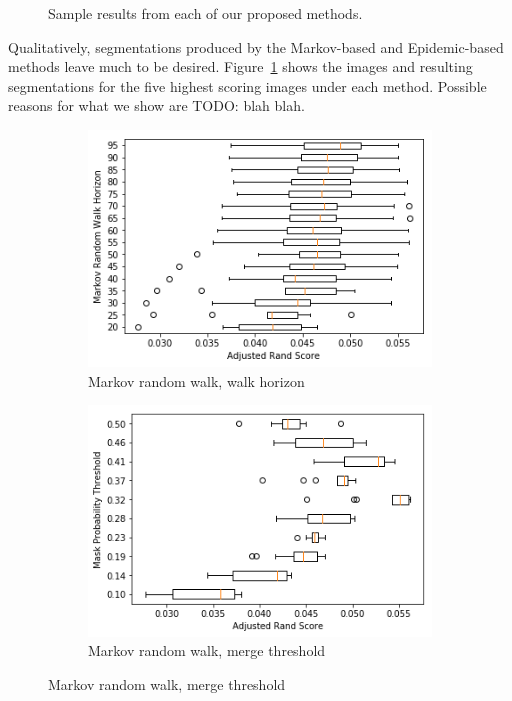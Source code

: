 \documentclass[twocolumn]{article}
\newcommand{\todo}[1]{}
\renewcommand{\todo}[1]{{\color{red} TODO: {#1}}}
\newcommand{\figref}[1]{Figure~\ref{fig:#1}}
\newcommand{\figlab}[1]{\label{fig:#1}}
\begin{document}
\begin{figure}[t!]
\caption{Sample results from each of our proposed methods.}
\figlab{sample_results}
\end{figure}

Qualitatively, segmentations produced by the Markov-based and Epidemic-based
methods leave much to be desired. \figref{sample_results} shows the images and
resulting segmentations for the five highest scoring images under each method.
Possible reasons for what we show are \todo{blah blah}.

\begin{figure}[t!]
  \centering

  \begin{subfigure}{0.49\linewidth}
    \includegraphics[width=\linewidth]{figs/markov_horizon.png}
    \caption{Markov random walk, walk horizon}
  \end{subfigure}
  \begin{subfigure}{0.49\linewidth}
    \includegraphics[width=\linewidth]{figs/markov_thresh.png}
    \caption{Markov random walk, merge threshold}
  \end{subfigure}


\end{figure}
\end{document}
